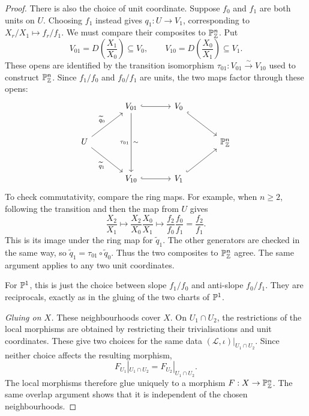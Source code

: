 \begin{proof}
    There is also the choice of unit coordinate. Suppose \(f_0\) and
    \(f_1\) are both units on \(U\). Choosing \(f_1\) instead gives
    \(q_1:U\to V_1\), corresponding to
    \(X_r/X_1\mapsto f_r/f_1\). We must compare their composites to
    \(\P^n_\Z\). Put
    \[
        V_{01}=D\left(\frac{X_1}{X_0}\right)\subseteq V_0,
        \qquad
        V_{10}=D\left(\frac{X_0}{X_1}\right)\subseteq V_1.
    \]
    These opens are identified by the transition isomorphism
    \(\tau_{01}:V_{01}\xrightarrow{\sim}V_{10}\) used to construct
    \(\P^n_\Z\). Since \(f_1/f_0\) and \(f_0/f_1\) are units, the two
    maps factor through these opens:
    \[
        \begin{tikzcd}[column sep=large,row sep=large]
            & V_{01}
            \arrow[r,hook]
            \arrow[dd,"\tau_{01}"',"\sim"]
            & V_0 \arrow[dr,hook] & \\
            U \arrow[ur,"\widetilde q_0"]
            \arrow[dr,"\widetilde q_1"']
            & & & \P^n_\Z \\
            & V_{10} \arrow[r,hook]
            & V_1 \arrow[ur,hook] &
        \end{tikzcd}
    \]
    To check commutativity, compare the ring maps. For example, when
    \(n\ge2\), following the transition and then the map from \(U\) gives
    \[
        \frac{X_2}{X_1}
        \longmapsto\frac{X_2}{X_0}\frac{X_0}{X_1}
        \longmapsto\frac{f_2}{f_0}\frac{f_0}{f_1}
        =\frac{f_2}{f_1}.
    \]
    This is its image under the ring map for \(\widetilde q_1\).
    The other generators are checked in the same way, so
    \(\widetilde q_1=\tau_{01}\circ\widetilde q_0\).
    Thus the two composites to \(\P^n_\Z\) agree. The same argument
    applies to any two unit coordinates.

    For \(\P^1\), this is just the choice between slope \(f_1/f_0\)
    and anti-slope \(f_0/f_1\). They are reciprocals, exactly as in
    the gluing of the two charts of \(\P^1\).

    \emph{Gluing on \(X\).}
    These neighbourhoods cover \(X\). On \(U_1\cap U_2\), the restrictions
    of the local morphisms are obtained by restricting their
    trivialisations and unit coordinates. These give two choices for
    the same data \((\mathcal{L},\iota)|_{U_1\cap U_2}\). Since neither
    choice affects the resulting morphism,
    \[
        F_{U_1}|_{U_1\cap U_2}=F_{U_2}|_{U_1\cap U_2}.
    \]
    The local morphisms therefore glue uniquely to a morphism
    \(F:X\to\P^n_\Z\). The same overlap argument shows that it is
    independent of the chosen neighbourhoods.
\end{proof}

